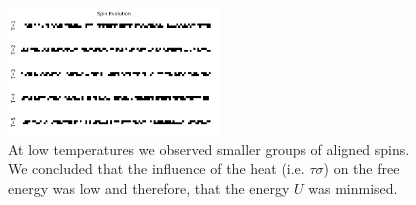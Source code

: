 \documentclass[a4paper]{article}
\begin{document}
    \begin{figure}
        \centering
        \includegraphics[width=0.5\textwidth]{pub/figures/q1a.pdf}
        \caption{At low temperatures we observed smaller groups of aligned %
            spins. We concluded that the influence of the heat (i.e. %
            \(\tau\sigma\)) on the free energy was low and therefore, that %
            the energy \(U\) was minmised.}
        \label{FIG1}
    \end{figure}
\end{document}
